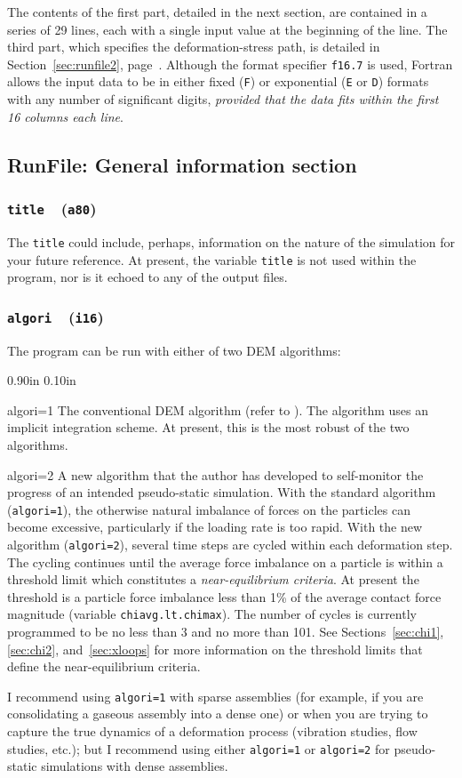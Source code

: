 \documentclass[letterpaper,11pt]{article}
\newcommand{\Var}[2]{\texttt{#1}\ \  (\texttt{#2})}
\newlength{\Labelwidth}
\newcommand{\Entrylabel}[1]{\makebox[\Labelwidth][r]{\texttt{#1}}}
\newenvironment{Options}
{\begin{list}{}{%
\renewcommand{\makelabel}{\Entrylabel}%
\setlength{\leftmargin} {0.90in}%
\setlength{\rightmargin}{0.00in}%
\setlength{\labelsep}   {0.10in}%
\setlength{\labelwidth} {\Labelwidth}%
}}
{\end{list}}
\begin{document}
The contents of the first part, detailed in the next section,
are contained in a series of 29 lines, each with a single input value 
at the beginning of the line.
The third part, which specifies the deformation-stress path, 
is detailed in Section~\ref{sec:runfile2},
page~\pageref{sec:runfile2}.
Although the format specifier \texttt{f16.7} is used, Fortran allows
the input data to be in either fixed (\texttt{F}) or
exponential (\texttt{E} or \texttt{D}) formats with any number
of significant digits, \emph{provided that the data fits within the 
first 16 columns each line}.
%
\subsection{\textsf{RunFile}: General information section}%
\label{sec:runfile1}
\subsubsection[\texttt{title}]{\Var{title}{a80}}
The \texttt{title} could include, perhaps, information on the nature of
the simulation for your future reference.
At present, the variable \texttt{title} is not used within the
program, nor is it echoed to any of the output files.
%
\subsubsection[\texttt{algori}]{\Var{algori}{i16}}\label{sec:algori}
The program can be run with either of two DEM algorithms:
\begin{Options}
\item[algori=1]
The conventional DEM algorithm (refer to ).
The algorithm uses an implicit integration scheme.
At present, this is the most robust of the two algorithms.
\item[algori=2]
A new algorithm that the author has developed to self-monitor
the progress of an intended pseudo-static simulation.
With the standard algorithm (\texttt{algori=1}), the
otherwise natural imbalance of forces on the particles can
become excessive, particularly if the loading rate is
too rapid.
With the new algorithm (\texttt{algori=2}), 
several time steps are cycled within
each deformation step.
The cycling continues until the average force imbalance on a particle
is within a threshold limit which constitutes a
\emph{near-equilibrium criteria}.
At present the threshold is a particle force imbalance less than 1\%
of the average contact force magnitude
(variable \texttt{chiavg.lt.chimax}).
The number of cycles is currently programmed to be no less than 3 and 
no more than 101.
See Sections~\ref{sec:chi1}, \ref{sec:chi2}, and~\ref{sec:xloops}
for more information on the threshold limits that define
the near-equilibrium criteria.
\par
I recommend using \texttt{algori=1} with sparse assemblies
(for example, if you are consolidating a gaseous assembly into a
dense one) or when you are trying to capture the true dynamics of 
a deformation process (vibration studies, flow studies, etc.);
but I recommend using either
\texttt{algori=1} or \texttt{algori=2} for pseudo-static simulations
with dense assemblies.
\end{Options}
\end{document}
